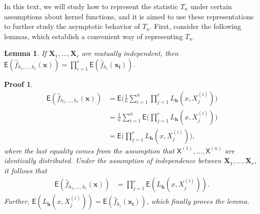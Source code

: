 \documentclass{article}
\newtheorem{lemma}{Lemma}[section]
\newtheorem{Proof}{Proof}[section]
\begin{document}
In this text, we will study how to represent the statistic $T_n$ under certain assumptions about kernel functions, and it is aimed to use these representations to further study the asymptotic behavior of $T_n$. First, consider the following lemmas, which establish a convenient way of representing $T_n$.
\begin{lemma}\label{lemma-prod-expec-values}
    If $\mathbf{X}_1, \dots, \mathbf{X}_r$ are mutually independent, then $\mathsf{E} (\hat{f}_{h_1, \dots, h_r}(\mathbf{x})) = \prod_{i = 1}^{r} \mathsf{E} (\hat{f}_{h_i}(\mathbf{x_i}))$.
\end{lemma}
\begin{Proof}
    \begin{align}
        \mathsf{E} (\hat{f}_{h_1, \dots, h_r}(\mathbf{x})) &= \mathsf{E} \Bigg( \frac{1}{n} \sum_{i=1}^{n} \prod_{j=1}^{r} L_{\mathbf{h}} (x,X_j^{(i)}) \Bigg) \\
        &= \frac{1}{n} \sum_{i=1}^{n} \mathsf{E} \Bigg( \prod_{j=1}^{r} L_{\mathbf{h}} (x,X_j^{(i)}) \Bigg) \\
        &= \mathsf{E} \Bigg( \prod_{j=1}^{r} L_{\mathbf{h}} (x,X_j^{(i)}) \Bigg),
    \end{align}
    where the last equality comes from the assumption that $\mathsf{X}^{(1)}, \dots, \mathsf{X}^{(n)}$ are identically distributed. Under the assumption of independence between $\mathbf{X}_1, \dots, \mathbf{X}_r$, it follows that
    \begin{align}
        \mathsf{E} (\hat{f}_{h_1, \dots, h_r}(\mathbf{x})) &= \prod_{j=1}^{r} \mathsf{E} (  L_{\mathbf{h}} (x,X_j^{(i)}) ).
    \end{align}
    Further, $\mathsf{E} (  L_{\mathbf{h}} (x,X_j^{(i)}) ) = \mathsf{E} (\hat{f}_{h_i}(\mathbf{x_i}))$, which finally proves the lemma.
\end{Proof}
\end{document}
